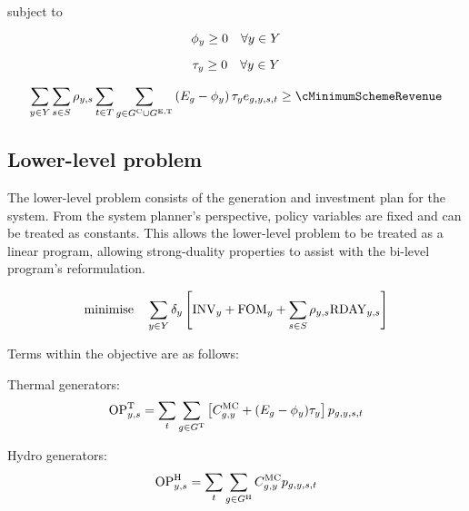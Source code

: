 \documentclass{article}
\DeclareMathOperator*{\minimise}{minimise}
\begin{document}
subject to

\begin{equation}
	\phi_{y} \geq 0 \quad \forall y \in Y
\end{equation}

\begin{equation}
	\tau_{y} \geq 0 \quad \forall y \in Y
\end{equation}

\begin{equation}
	\sum\limits_{\iYear \in \sYears} \sum\limits_{\iScenario \in \sScenarios} \cScenarioDuration \sum\limits_{\iInterval \in \sIntervals} \sum\limits_{\iGenerator \in \sGeneratorsCandidate \cup \sGeneratorsExistingThermal}\left(\cEmissionsIntensity -\vBaseline\right)\vPermitPrice \vEnergy \geq \cMinimumSchemeRevenue
\end{equation}

\subsection{Lower-level problem}
The lower-level problem consists of the generation and investment plan for the system. From the system planner's perspective, policy variables are fixed and can be treated as constants. This allows the lower-level problem to be treated as a linear program, allowing strong-duality properties to assist with the bi-level program's reformulation.

\begin{equation}
	\minimise \quad \sum\limits_{\iYear\in\sYears} \cDiscountRate \left[\cInvestmentCost + \cFixedOperationsMaintenanceCost + \sum\limits_{\iScenario \in \sScenarios} \cScenarioDuration \cOperatingCostScenario \right]
\end{equation}

Terms within the objective are as follows:

Thermal generators:
\begin{equation}
	\mathrm{OP}^{\mathrm{T}}_{y,s} = \sum\limits_{t} \sum\limits_{g \in G^{\mathrm{T}}} \left[C^{\mathrm{MC}}_{g,y} + (E_{g} - \phi_{y})\tau_{y}\right]p_{g,y,s,t}\\
\end{equation}

Hydro generators:
\begin{equation}
	\mathrm{OP}^{\mathrm{H}}_{y,s} = \sum\limits_{t}\sum\limits_{g \in G^{\mathrm{H}}}C^{\mathrm{MC}}_{g,y} p_{g,y,s,t}
\end{equation}
\end{document}
